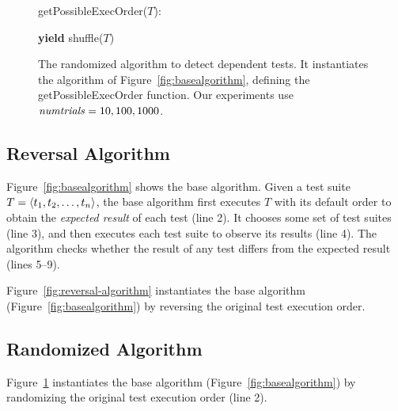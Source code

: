 \begin{figure}[t]
getPossibleExecOrder($T$):\\
\vspace{-5mm}
\begin{algorithmic}[1]
\STATE \textbf{yield} shuffle($T$)
\ENDFOR
\end{algorithmic}
\vspace{-3mm}
\caption {The randomized algorithm to detect dependent tests.
It instantiates the algorithm of Figure~\ref{fig:basealgorithm}, defining
the getPossibleExecOrder function.
Our experiments use $\mathit{numtrials} = 10,
100, 1000$.}
\label{fig:randalgorithm}
\end{figure}

\subsection{Reversal Algorithm}
\label{sec:reversal}


Figure~\ref{fig:basealgorithm} shows the base algorithm.
Given a test suite $T =  \langle t_1, t_2, \ldots, t_n \rangle $, the base algorithm
first executes $T$ with its default order
to obtain the \emph{expected result} of each test (line 2).
It chooses some set of test suites (line 3), and then executes
each test suite
to observe its results (line 4). The algorithm checks
whether the result of any test differs from the
expected result (lines 5--9). 

Figure~\ref{fig:reversal-algorithm} instantiates the
base algorithm (Figure~\ref{fig:basealgorithm})
by reversing the original test execution
order.


\subsection{Randomized Algorithm}
\label{sec:randomized}

Figure~\ref{fig:randalgorithm} instantiates the
base algorithm (Figure~\ref{fig:basealgorithm})
by randomizing the original test execution
order (line 2).




